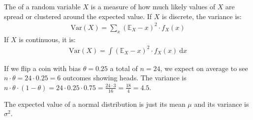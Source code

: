 \documentclass[nobib,nofonts]{tufte-handout}
\newcommand{\mult}{\ensuremath{\cdot}}
\begin{document}
The  of a random variable $X$ is a measure of how much likely values of $X$
are spread or clustered around the expected value. If $X$ is discrete, the variance is:
\begin{align*}
  \text{Var}(X) = \sum_x (\mathds{E}_X - x)^2 \mult f_X(x)
\end{align*}
If $X$ is continuous, it is:
\begin{align*}
  \text{Var}(X) = \int (\mathds{E}_X - x)^2 \mult f_X(x) \ \text{d}x
\end{align*}

\begin{example}
  If we flip a coin with bias $\theta = 0.25$ a total of $n=24$, we expect on average to see
  $n \mult \theta = 24 \mult 0.25 = 6$ outcomes showing heads. The variance is
  $n \mult \theta \mult (1-\theta) = 24 \mult 0.25 \mult 0.75 = \frac{24 \mult 3}{16} =
  \frac{18}{4} = 4.5$.

  The expected value of a normal distribution is just its mean $\mu$ and its variance is
  $\sigma^2$.
\end{example}

\end{document}
